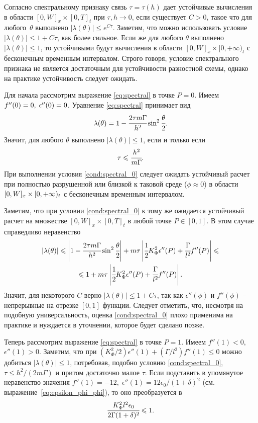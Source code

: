 Согласно спектральному признаку связь $\tau = \tau(h)$ дает устойчивые вычисления в области $[0, W]_x \times [0, T]_t$ при $\tau, h \to 0$, если существует $C > 0$, такое что для любого~$\theta$ выполнено $|\lambda(\theta)| \leqslant e^{C\tau}$. Заметим, что можно использовать условие $|\lambda(\theta)| \leqslant 1 + C\tau$, как более сильное. Если же для любого $\theta$ выполнено $|\lambda(\theta)| \leqslant 1$, то устойчивыми будут вычисления в области $[0, W]_x \times [0, +\infty)_t$ с бесконечным временным интервалом. Строго говоря, условие спектрального признака не является достаточным для устойчивости разностной схемы, однако на практике устойчивость следует ожидать.

Для начала рассмотрим выражение \eqref{eq:spectral} в точке $P = 0$. Имеем $f''(0) \hm = 0, \; \epsilon''(0) = 0$. Уравнение \eqref{eq:spectral} принимает вид
$$\lambda(\theta) = 1 - \cfrac{2 \tau m \Gamma}{h^2} \sin^2 \cfrac{\theta}{2} {\text{.}}$$
Значит, для любого $\theta$ выполнено $|\lambda(\theta)| \leqslant 1$, если и только если
\begin{equation}
	 \tau \leqslant \cfrac{h^2}{m \Gamma} {\text{.}}
	 \label{cond:spectral_0}
\end{equation}
При выполнении условия \eqref{cond:spectral_0} следует ожидать устойчивый расчет при полностью разрушенной или близкой к таковой среде ($\phi \approx 0$) в области $[0, W]_x \hm \times [0, +\infty)_t$ с бесконечным временным интервалом.

Заметим, что при условии \eqref{cond:spectral_0} к тому же ожидается устойчивый расчет на множестве $[0, W]_x \times [0, T]_t$ в любой точке $P \in [0, 1]$. В этом случае справедливо неравенство
\begin{multline*}
	|\lambda(\theta)| \leqslant \left| 1 - \cfrac{2 \tau m \Gamma}{h^2} \sin^2 \cfrac{\theta}{2} \right| + m \tau \left| \cfrac{1}{2} K_\Phi^2 \epsilon''(P) + \cfrac{\Gamma}{l^2} f''(P) \right| \leqslant \\ \leqslant 1 + m \tau \left| \cfrac{1}{2} K_\Phi^2 \epsilon''(P) + \cfrac{\Gamma}{l^2} f''(P) \right| {\text{.}}
\end{multline*}
Значит, для некоторого $C$ верно $|\lambda(\theta)| \leqslant 1 + C \tau$, так как $\epsilon''(\phi)$ и $f''(\phi)$ -- непрерывные на отрезке $[0, 1]$ функции. Следует отметить, что, несмотря на подобную универсальность, оценка \eqref{cond:spectral_0} плохо применима на практике и нуждается в уточнении, которое будет сделано позже.

Теперь рассмотрим выражение \eqref{eq:spectral} в точке $P = 1$. Имеем $f''(1) < 0,$ $\epsilon''(1) > 0$. Заметим, что при $(K_\Phi^2 / 2) \epsilon''(1) + (\Gamma / l^2) f''(1) \leqslant 0$ можно добиться $|\lambda(\theta)| \leqslant 1$, потребовав, подобно условию \eqref{cond:spectral_0}, $\tau \leqslant h^2 / (2m \Gamma)$ и притом достаточно малое $\tau$. Если подставить в упомянутое неравенство значения $f''(1) = -12, \; \epsilon''(1) = 12 \epsilon_0 / (1 + \delta)^2$ (см. выражение~\eqref{eq:epsilon_phi_phi}), то оно преобразуется в
\begin{equation}
	\cfrac{K_\Phi^2 l^2 \epsilon_0}{2 \Gamma (1 + \delta)^2} \leqslant 1 {\text{.}}
	\label{cond:spectral_possible_1}
\end{equation}

